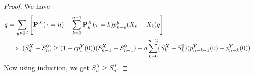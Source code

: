 \documentclass[main]{subfiles}
\begin{document}
\begin{proof}
    We have \begin{equation*}
        \begin{aligned}
             & q= \sum_{y\in\mathbb{Z}^d} \left[\P^X(\tau=n)+\sum_{k=0}^{n-1}\P^X_y(\tau=k)p_{n-k}^y(X_n-X_k)q\right]                       \\
             & \implies (S_n^X-S_n^0) \geq (1- qp_i^Y(0))(S_{n-1}^X-S_{n-1}^0)+ q\sum_{k=0}^{n-2}(S_k^X-S_k^0)(p_{n-k-1}^Y(0)-p_{n-k}^Y(0))
        \end{aligned}
    \end{equation*}
    Now using induction, we get $S_n^X\geq S_n^0.$

\end{proof}
\end{document}

